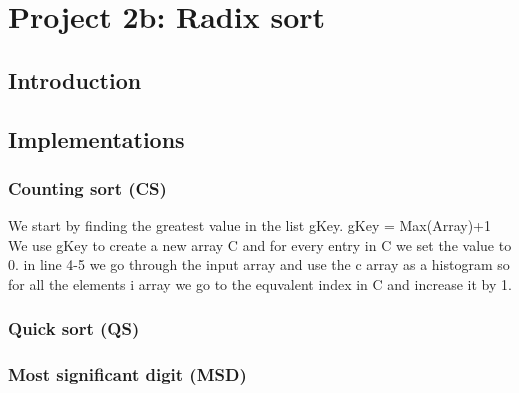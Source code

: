 
\chapter{Project 2b: Radix sort} %

\label{Chapter3} %




\section{Introduction}



\section{Implementations}




\subsection{Counting sort (CS)}
We start by finding the greatest value in the list gKey.
gKey = Max(Array)+1
We use gKey to create a new array C and for every entry in C we set the value to 0.
in line 4-5 we go through the input array and use the c array as a histogram so for all the elements i array we go to the equvalent index in C and increase it by 1.



\subsection{Quick sort (QS)}



\subsection{Most significant digit (MSD)}


